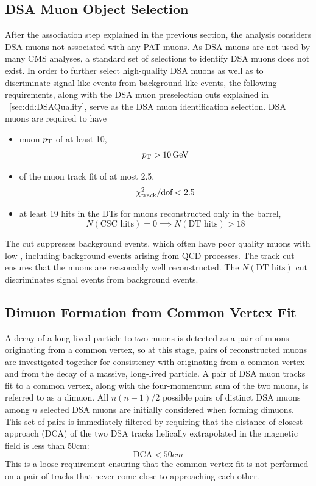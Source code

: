 \subsection{DSA Muon Object Selection}
\label{sec:dd:DSAObject}
After the \DSAToPAT association step explained in the previous section, the analysis considers DSA muons not associated with any PAT muons.
As DSA muons are not used by many CMS analyses, a standard set of selections to identify DSA muons does not exist.
In order to further select high-quality DSA muons as well as to discriminate signal-like events from background-like events, the following requirements, along with the DSA muon preselection cuts explained in \Sec~\ref{sec:dd:DSAQuality}, serve as the DSA muon identification selection.
DSA muons are required to have
\begin{itemize}
  \item muon $p_{\mathrm{T}}$ of at least 10\GeV, \ie $$p_{\mathrm{T}} > 10\,\text{Ge\hspace{-.08em}V}$$
  \item \normchisq of the muon track fit of at most 2.5, \ie $$\chi^{2}_\text{track}/\text{dof} < 2.5$$
  \item at least 19 hits in the DTs for muons reconstructed only in the barrel, \ie $$N(\text{CSC hits}) = 0 \implies N(\text{DT hits}) > 18$$
\end{itemize}

The \pT cut suppresses background events, which often have poor quality muons with low \pT, including background events arising from QCD processes.
The track \normchisq cut ensures that the muons are reasonably well reconstructed.
The $N(\text{DT hits})$ cut discriminates signal events from background events.

\subsection{Dimuon Formation from Common Vertex Fit}
\label{sec:dd:DimVertex}
A decay of a long-lived particle to two muons is detected as a pair of muons originating from a common vertex, so at this stage, pairs of reconstructed muons are investigated together for consistency with originating from a common vertex and from the decay of a massive, long-lived particle.
A pair of DSA muon tracks fit to a common vertex, along with the four-momentum sum of the two muons, is referred to as a dimuon.
All $n(n-1)/2$ possible pairs of distinct DSA muons among $n$ selected DSA muons are initially considered when forming dimuons.
This set of pairs is immediately filtered by requiring that the distance of closest approach (DCA) of the two DSA tracks helically extrapolated in the magnetic field is less than 50\unit{cm}:
$$\text{DCA} < 50\unit{cm}$$
This is a loose requirement ensuring that the common vertex fit is not performed on a pair of tracks that never come close to approaching each other.

